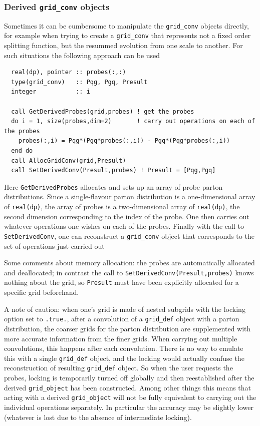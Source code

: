 \documentclass[12pt]{article}
\begin{document}
\subsubsection{Derived \texttt{grid\_conv} objects}
\label{sec:derived_grid_conv}

Sometimes it can be cumbersome to manipulate the \texttt{grid\_conv}
objects directly, for example when trying to create a
\texttt{grid\_conv} that represents not a fixed order splitting
function, but the resummed evolution from one scale to another. For
such situations the following approach can be used
\begin{lstlisting}
  real(dp), pointer :: probes(:,:)
  type(grid_conv)   :: Pqg, Pgq, Presult
  integer           :: i

  call GetDerivedProbes(grid,probes) ! get the probes
  do i = 1, size(probes,dim=2)       ! carry out operations on each of the probes
    probes(:,i) = Pqg*(Pgq*probes(:,i)) - Pgq*(Pqg*probes(:,i))
  end do
  call AllocGridConv(grid,Presult)
  call SetDerivedConv(Presult,probes) ! Presult = [Pqg,Pgq]
\end{lstlisting}
Here \texttt{GetDerivedProbes} allocates and sets up an array of probe
parton distributions. Since a single-flavour parton distribution is a
one-dimensional array of \texttt{real(dp)}, the array of probes is a
two-dimensional array of \texttt{real(dp)}, the second dimension
corresponding to the index of the probe. One then carries out whatever
operations one wishes on each of the probes. Finally with the call to
\texttt{SetDerivedConv}, one can reconstruct a \texttt{grid\_conv}
object that corresponds to the set of operations just carried out

Some comments about memory allocation: the probes are automatically
allocated and deallocated; in contrast the call to
\texttt{SetDerivedConv(Presult,probes)} knows nothing about the grid,
so \texttt{Presult} must have been explicitly allocated for a specific
grid beforehand.

A note of caution: when one's grid is made of nested subgrids with the
locking option set to \texttt{.true.}, after a convolution of a
\texttt{grid\_def} object with a parton distribution, the coarser
grids for the parton distribution are supplemented with more accurate
information from the finer grids. When carrying out multiple
convolutions, this happens after each convolution.  There is no way to
emulate this with a single \texttt{grid\_def} object, and the locking
would actually confuse the reconstruction of resulting
\texttt{grid\_def} object. So when the user requests the probes,
locking is temporarily turned off globally and then reestablished
after the derived \texttt{grid\_object} has been constructed. Among
other things this means that acting with a derived
\texttt{grid\_object} will not be fully equivalent to carrying out the
individual operations separately. In particular the accuracy may be
slightly lower (whatever is lost due to the absence of intermediate
locking).
\end{document}
